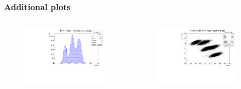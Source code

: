 \documentclass{beamer}
\begin{document}
    \begin{frame}
        \frametitle{Additional plots}
        \vspace{-2mm}
        \begin{columns}
            \begin{column}{0.5\textwidth}
        \begin{figure}[!h]
            \centering
            \includegraphics[width =0.9\columnwidth]{figures/pdf/charge.pdf}
            \label{fig:anglesinmuon}
        \end{figure}
    \end{column}
    \begin{column}{0.5\textwidth}
        \begin{figure}[!h]
            \centering
            \includegraphics[width =0.9\columnwidth]{figures/pdf/phch1.pdf}
            \label{fig:anglesinmuon}
        \end{figure}
    \end{column}

\end{columns}
\end{frame}
\end{document}
